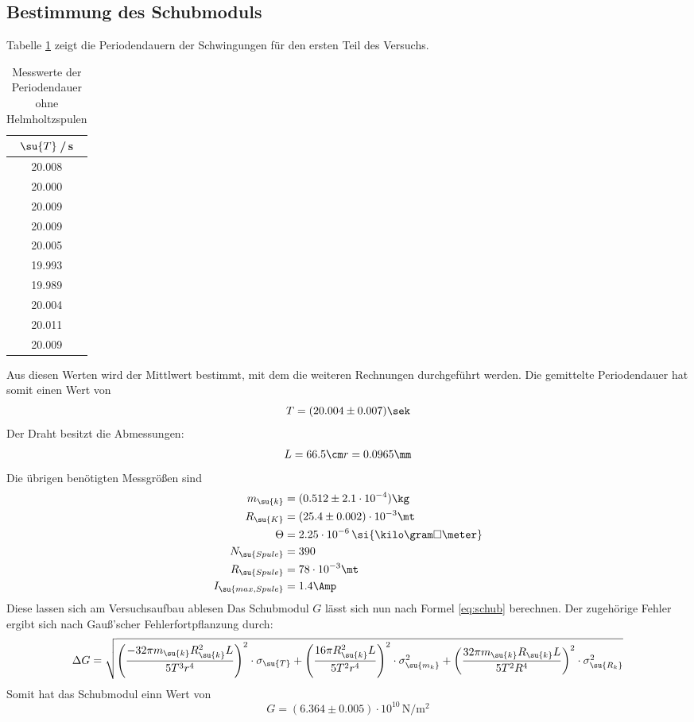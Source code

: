 \subsection{Bestimmung des Schubmoduls}
Tabelle \ref{tab:data1} zeigt die Periodendauern der Schwingungen für den ersten
Teil des Versuchs.
\begin{table}
  \begin{tabular}{c}
    \toprule
    $\su{T}$\,/\,s \\
    \midrule
    20.008 \\
    20.000 \\
    20.009 \\
    20.009 \\
    20.005 \\
    19.993 \\
    19.989 \\
    20.004 \\
    20.011 \\
    20.009 \\
    \bottomrule
  \end{tabular}
  \caption{Messwerte der Periodendauer ohne Helmholtzspulen}
  \label{tab:data1}
\end{table}
Aus diesen Werten wird der Mittlwert bestimmt, mit dem die weiteren Rechnungen
durchgeführt werden. Die gemittelte Periodendauer hat somit einen Wert von
\begin{equation*}
  T = (20.004 \pm 0.007)\sek
\end{equation*}
Der Draht besitzt die Abmessungen:
\begin{align*}
  L = 66.5 \cm
  r = 0.0965 \mm
\end{align*}
Die übrigen benötigten Messgrößen sind
\begin{align*}
  m_\su{k} &= (0.512 \pm 2.1\cdot10^{-4})\kg \\
  R_\su{K} &= (25.4 \pm 0.002)\cdot10^{-3}\mt\\
  \Theta   &=  2.25\cdot10^{-6}\,\si{\kilo\gram\square\meter}\\
  N_\su{Spule} &= 390\\
  R_\su{Spule} &= 78\cdot10^{-3}\mt\\
  I_\su{max,Spule} &= 1.4\Amp
\end{align*}
Diese lassen sich am Versuchsaufbau ablesen %
Das Schubmodul $G$ lässt sich nun nach Formel \eqref{eq:schub} berechnen. Der
zugehörige Fehler ergibt sich nach Gauß'scher Fehlerfortpflanzung durch:
\begin{equation*}
  \Delta G = \sqrt{\left(\frac{-32\pi m_\su{k} R_\su{k}^2 L}{5T^3 r^4}\right)^2
  \cdot\sigma_\su{T} + \left(\frac{16\pi R_\su{k}^2L}{5T^2r^4}\right)^2\cdot
  \sigma_\su{m_k}^2+\left(\frac{32\pi m_\su{k}R_\su{k}L}{5T^2R^4}\right)^2\cdot
  \sigma_\su{R_k}^2}
\end{equation*}
Somit hat das Schubmodul einn Wert von
\begin{equation*}
  G = (6.364 \pm 0.005)\cdot10^{10}\,\si{\newton\per\square\meter}
\end{equation*}
